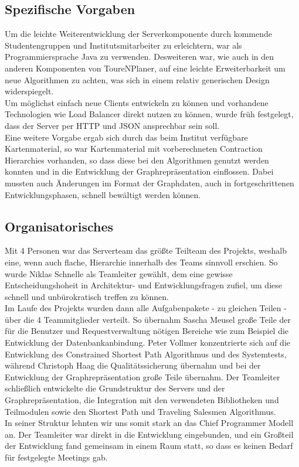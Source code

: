 \subsection*{Spezifische Vorgaben}
Um die leichte Weiterentwicklung der Serverkomponente durch kommende Studentengruppen und Institutsmitarbeiter zu erleichtern, war als Programmiersprache Java zu verwenden. Desweiteren war, wie auch in den anderen Komponenten von ToureNPlaner, auf eine leichte Erweiterbarkeit um neue Algorithmen zu achten, was sich in einem relativ generischen Design widerspiegelt.\\
Um möglichst einfach neue Clients entwickeln zu können und vorhandene Technologien wie Load Balancer direkt nutzen zu können, wurde früh festgelegt, dass der Server per HTTP und JSON ansprechbar sein soll.\\
Eine weitere Vorgabe ergab sich durch das beim Institut verfügbare Kartenmaterial, so war Kartenmaterial mit vorberechneten Contraction Hierarchies vorhanden, so dass diese bei den Algorithmen genutzt werden konnten und in die Entwicklung der Graphrepräsentation einflossen. Dabei mussten auch Änderungen im Format der Graphdaten, auch in fortgeschrittenen Entwicklungsphasen, schnell bewältigt werden können.
\subsection*{Organisatorisches}
Mit 4 Personen war das Serverteam das größte Teilteam des Projekts, weshalb eine, wenn auch flache, Hierarchie innerhalb des Teams sinnvoll erschien. So wurde Niklas Schnelle als Teamleiter gewählt, dem eine gewisse Entscheidungshoheit in Architektur- und Entwicklungsfragen zufiel, um diese schnell und unbürokratisch treffen zu können.\\
Im Laufe des Projekts wurden dann alle Aufgabenpakete - zu gleichen Teilen - über die 4 Teammitglieder verteilt.
So übernahm Sascha Meusel große Teile der für die Benutzer und Requestverwaltung nötigen Bereiche wie zum Beispiel die Entwicklung der Datenbankanbindung.
Peter Vollmer konzentrierte sich auf die Entwicklung des Constrained Shortest Path Algorithmus und des Systemtests, während Christoph Haag die Qualitätssicherung übernahm und bei der Entwicklung der Graphrepräsentation große Teile übernahm. Der Teamleiter schließlich entwickelte die Grundstruktur des Servers und der Graphrepräsentation, die Integration mit den verwendeten Bibliotheken und Teilmodulen sowie den Shortest Path und Traveling Salesmen Algorithmus.\\
In seiner Struktur lehnten wir uns somit stark an das Chief Programmer Modell an. Der Teamleiter war direkt in die Entwicklung eingebunden, und ein Großteil der Entwicklung fand gemeinsam in einem Raum statt, so dass es keinen Bedarf für festgelegte Meetings gab.
